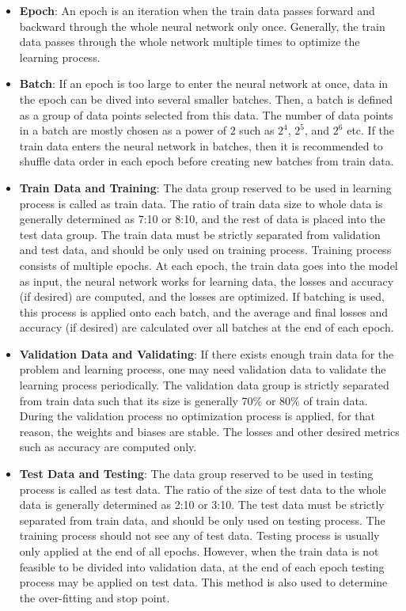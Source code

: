 \begin{itemize}
\item \textbf{Epoch}: An epoch is an iteration when the train data passes forward and backward through the whole neural network only once. Generally, the train data passes through the whole network multiple times to optimize the learning process.

\item \textbf{Batch}: If an epoch is too large to enter the neural network at once, data in the epoch can be dived into several smaller batches. Then, a batch is defined as a group of data points selected from this data. The number of data points in a batch are mostly chosen as a power of $2$ such as $2^4$, $2^5$, and  $2^6$ etc. If the train data enters the neural network in batches, then it is recommended to shuffle data order in each epoch before creating new batches from train data.
  
\item \textbf{Train Data and Training}: The data group reserved to be used in learning process is called as train data. The ratio of train data size to whole data is generally determined as 7:10 or 8:10, and the rest of data is placed into the test data group. The train data must be strictly separated from validation and test data, and should be only used on training process. Training process consists of multiple epochs. At each epoch, the train data goes into the model as input, the neural network works for learning data, the losses and accuracy (if desired) are computed, and the losses are optimized. If batching is used, this process is applied onto each batch, and the average and final losses and accuracy (if desired) are calculated over all batches at the end of each epoch.
  
\item \textbf{Validation Data and Validating}: If there exists enough train data for the problem and learning process, one may need validation data to validate the learning process periodically. The validation data group is strictly separated from train data such that its size is generally 70\% or 80\% of train data. During the validation process no optimization process is applied, for that reason, the weights and biases are stable. The losses and other desired metrics such as accuracy are computed only.
  
\item \textbf{Test Data and Testing}: The data group reserved to be used in testing process is called as test data. The ratio of the size of test data to the whole data is generally determined as 2:10 or 3:10. The test data must be strictly separated from train data, and should be only used on testing process. The training process should not see any of test data. Testing process is usually only applied at the end of all epochs. However, when the train data is not feasible to be divided into validation data, at the end of each epoch testing process may be applied on test data. This method is also used to determine the over-fitting and stop point.
    

\end{itemize}
